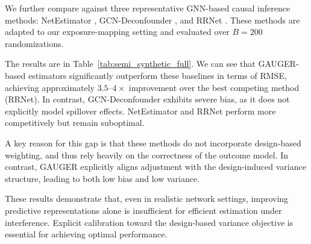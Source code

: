 \documentclass[twoside]{article}
\theoremstyle{plain}
\theoremstyle{definition}
\theoremstyle{remark}
\begin{document}
We further compare against three representative GNN-based causal inference methods: NetEstimator \citep{jiang2022estimating}, GCN-Deconfounder \citep{guo2020learning}, and RRNet \citep{cai2023generalization}. These methods are adapted to our exposure-mapping setting and evaluated over $B=200$ randomizations.

The results are in Table~\ref{tab:semi_synthetic_full}. We can see that GAUGER-based estimators significantly outperform these baselines in terms of RMSE, achieving approximately $3.5$--$4\times$ improvement over the best competing method (RRNet). In contrast, GCN-Deconfounder exhibits severe bias, as it does not explicitly model spillover effects. NetEstimator and RRNet perform more competitively but remain suboptimal.

A key reason for this gap is that these methods do not incorporate design-based weighting, and thus rely heavily on the correctness of the outcome model. In contrast, GAUGER explicitly aligns adjustment with the design-induced variance structure, leading to both low bias and low variance.

These results demonstrate that, even in realistic network settings, improving predictive representations alone is insufficient for efficient estimation under interference. Explicit calibration toward the design-based variance objective is essential for achieving optimal performance.
\end{document}
